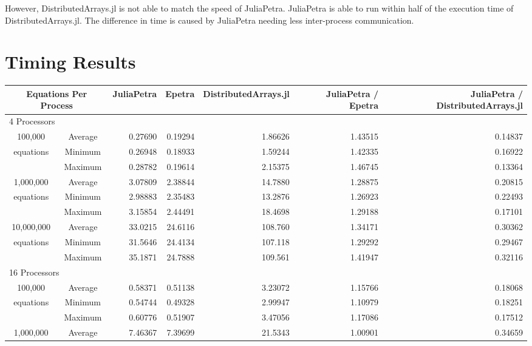 \documentclass[acmsmall]{acmart}
\begin{document}
However, DistributedArrays.jl is not able to match the speed of JuliaPetra.
JuliaPetra is able to run within half of the execution time of DistributedArrays.jl.
The difference in time is caused by JuliaPetra needing less inter-process communication.

\section{Timing Results}

\begin{table}
\begin{tabular}{|c c|r|r|r||r|r|}
	\hline
		\multicolumn{2}{|c|}{Equations Per Process}
		& JuliaPetra
		& Epetra
		& \multicolumn{1}{m{1.8cm}||}{Distributed\-Arrays.jl}
		& \multicolumn{1}{m{1.75cm}|}{JuliaPetra / Epetra}
		& \multicolumn{1}{m{1.8cm}|}{JuliaPetra / Distributed\-Arrays.jl} \\
	\hline
		\multicolumn{7}{|l|}{4 Processors}\\
	\hline
		100,000			&Average & 0.27690 & 0.19294 & 1.86626 & 1.43515 & 0.14837 \\
		equations		&Minimum & 0.26948 & 0.18933 & 1.59244 & 1.42335 & 0.16922 \\
						&Maximum & 0.28782 & 0.19614 & 2.15375 & 1.46745 & 0.13364 \\
	\hline
		1,000,000		&Average & 3.07809 & 2.38844 & 14.7880 & 1.28875 & 0.20815 \\
		equations		&Minimum & 2.98883 & 2.35483 & 13.2876 & 1.26923 & 0.22493 \\
						&Maximum & 3.15854 & 2.44491 & 18.4698 & 1.29188 & 0.17101 \\
	\hline
		10,000,000		&Average & 33.0215 & 24.6116 & 108.760 & 1.34171 & 0.30362 \\
		equations		&Minimum & 31.5646 & 24.4134 & 107.118 & 1.29292 & 0.29467 \\
						&Maximum & 35.1871 & 24.7888 & 109.561 & 1.41947 & 0.32116 \\
	\hline
		\multicolumn{7}{|l|}{16 Processors}\\
	\hline
		100,000			&Average & 0.58371 & 0.51138 & 3.23072 & 1.15766 & 0.18068 \\
		equations		&Minimum & 0.54744 & 0.49328 & 2.99947 & 1.10979 & 0.18251 \\
						&Maximum & 0.60776 & 0.51907 & 3.47056 & 1.17086 & 0.17512 \\
	\hline
		1,000,000		&Average & 7.46367 & 7.39699 & 21.5343 & 1.00901 & 0.34659 \\

\end{tabular}
\end{table}
\end{document}
